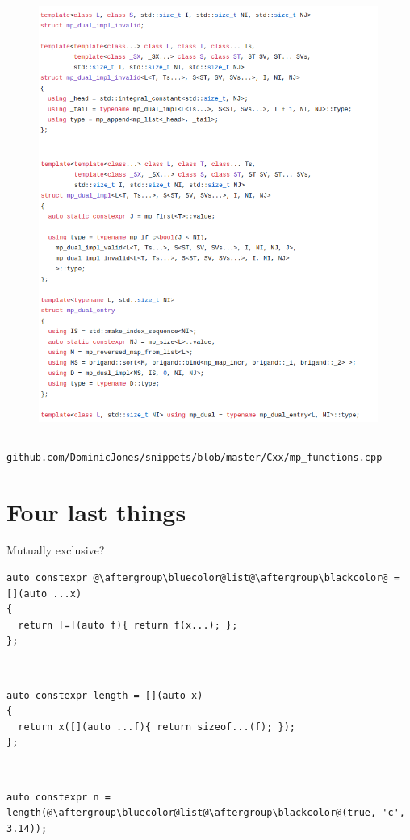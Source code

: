 \documentclass[xcolor=dvipsnames]{beamer}
\begin{document}
\begin{frame}[plain]
\begin{columns}[T]
\begin{column}{0.5\textwidth}
\begin{figure}[H]
        \includegraphics[width=0.99\textwidth]{dual_2}
      \end{figure}
    \end{column}%
  \end{columns}

\vspace{5mm}
\footnotesize{\texttt{github.com/DominicJones/snippets/blob/master/Cxx/mp\_functions.cpp}}
\end{frame}


\section{Four last things}


\begin{frame}[fragile]{Mutually exclusive?}
\begin{lstlisting}
auto constexpr @\aftergroup\bluecolor@list@\aftergroup\blackcolor@ = [](auto ...x)
{
  return [=](auto f){ return f(x...); };
};
\end{lstlisting}

~

\begin{lstlisting}
auto constexpr length = [](auto x)
{
  return x([](auto ...f){ return sizeof...(f); });
};
\end{lstlisting}

~

\begin{lstlisting}
auto constexpr n = length(@\aftergroup\bluecolor@list@\aftergroup\blackcolor@(true, 'c', 3.14));
\end{lstlisting}
\end{frame}
\end{document}
